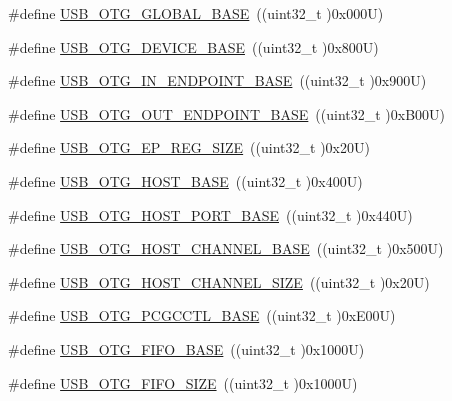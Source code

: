 \begin{DoxyCompactItemize}
\#define \hyperlink{group___peripheral__memory__map_ga044aa4388e72d9d47a03f387fb8926fb}{U\+S\+B\+\_\+\+O\+T\+G\+\_\+\+G\+L\+O\+B\+A\+L\+\_\+\+B\+A\+SE}~((uint32\+\_\+t )0x000\+U)
\item 
\#define \hyperlink{group___peripheral__memory__map_ga4d74a337597a77b1fca978202b519a18}{U\+S\+B\+\_\+\+O\+T\+G\+\_\+\+D\+E\+V\+I\+C\+E\+\_\+\+B\+A\+SE}~((uint32\+\_\+t )0x800\+U)
\item 
\#define \hyperlink{group___peripheral__memory__map_gad8f69041452615aeb3948600e3882246}{U\+S\+B\+\_\+\+O\+T\+G\+\_\+\+I\+N\+\_\+\+E\+N\+D\+P\+O\+I\+N\+T\+\_\+\+B\+A\+SE}~((uint32\+\_\+t )0x900\+U)
\item 
\#define \hyperlink{group___peripheral__memory__map_gaf0e972b8f028ecf44a652029efbd4642}{U\+S\+B\+\_\+\+O\+T\+G\+\_\+\+O\+U\+T\+\_\+\+E\+N\+D\+P\+O\+I\+N\+T\+\_\+\+B\+A\+SE}~((uint32\+\_\+t )0x\+B00\+U)
\item 
\#define \hyperlink{group___peripheral__memory__map_ga6fdb7429ad88e2d69440d6ecc4f4199e}{U\+S\+B\+\_\+\+O\+T\+G\+\_\+\+E\+P\+\_\+\+R\+E\+G\+\_\+\+S\+I\+ZE}~((uint32\+\_\+t )0x20\+U)
\item 
\#define \hyperlink{group___peripheral__memory__map_ga3bb2dd6c82eefd8587b6146ba36ae071}{U\+S\+B\+\_\+\+O\+T\+G\+\_\+\+H\+O\+S\+T\+\_\+\+B\+A\+SE}~((uint32\+\_\+t )0x400\+U)
\item 
\#define \hyperlink{group___peripheral__memory__map_ga42f433cb79ca69f09972e690fda6737a}{U\+S\+B\+\_\+\+O\+T\+G\+\_\+\+H\+O\+S\+T\+\_\+\+P\+O\+R\+T\+\_\+\+B\+A\+SE}~((uint32\+\_\+t )0x440\+U)
\item 
\#define \hyperlink{group___peripheral__memory__map_ga942c8c5241b80fbcf638fea0fa18bebd}{U\+S\+B\+\_\+\+O\+T\+G\+\_\+\+H\+O\+S\+T\+\_\+\+C\+H\+A\+N\+N\+E\+L\+\_\+\+B\+A\+SE}~((uint32\+\_\+t )0x500\+U)
\item 
\#define \hyperlink{group___peripheral__memory__map_ga266cb1dbb50faf447f9c15d2ee93a522}{U\+S\+B\+\_\+\+O\+T\+G\+\_\+\+H\+O\+S\+T\+\_\+\+C\+H\+A\+N\+N\+E\+L\+\_\+\+S\+I\+ZE}~((uint32\+\_\+t )0x20\+U)
\item 
\#define \hyperlink{group___peripheral__memory__map_gaa9766975aca084c257730879568bc7cf}{U\+S\+B\+\_\+\+O\+T\+G\+\_\+\+P\+C\+G\+C\+C\+T\+L\+\_\+\+B\+A\+SE}~((uint32\+\_\+t )0x\+E00\+U)
\item 
\#define \hyperlink{group___peripheral__memory__map_gace340350802904868673f0e839c4fa04}{U\+S\+B\+\_\+\+O\+T\+G\+\_\+\+F\+I\+F\+O\+\_\+\+B\+A\+SE}~((uint32\+\_\+t )0x1000\+U)
\item 
\#define \hyperlink{group___peripheral__memory__map_ga8781c4b2406c740d9fe540737a6a0188}{U\+S\+B\+\_\+\+O\+T\+G\+\_\+\+F\+I\+F\+O\+\_\+\+S\+I\+ZE}~((uint32\+\_\+t )0x1000\+U)
\end{DoxyCompactItemize}


